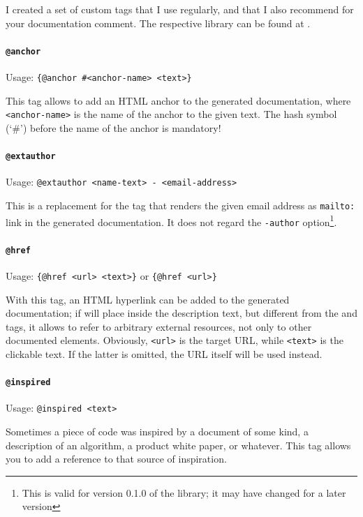 \documentclass[11pt,a4paper, titlepage, parskip=half, headsepline, footsepline, cleardoublepage=current, headheight=1cm]{scrbook}
\begin{document}
I created a set of custom tags that I use regularly, and that I also recommend for your documentation comment. The respective library can be found at \autocite{TQUADRAT_ORG_FOUNDATION_JAVADOC}.

\paragraph{\lstinline|@anchor|}\label{sec:TagAnchor}  Usage: \lstinline|{@anchor #<anchor-name> <text>}|

This tag allows to add an HTML anchor to the generated documentation, where \verb#<anchor-name># is the name of the anchor to the given text. The hash symbol (‘\#’) before the name of the anchor is mandatory!

\paragraph{\lstinline|@extauthor|}\label{sec:TagExtAuthor}  Usage: \lstinline|@extauthor <name-text> - <email-address>|

This is a replacement for the  tag that renders the given email address as \verb#mailto:# link in the generated documentation. It does not regard the \verb#-author# option\footnote{This is valid for version 0.1.0 of the library; it may have changed for a later version}. 

\paragraph{\lstinline|@href|}\label{sec:TagHref}  Usage: \lstinline|{@href <url> <text>}| or \lstinline|{@href <url>}|

With this tag, an HTML hyperlink can be added to the generated documentation; if will place inside the description text, but different from the  and  tags, it allows to refer to arbitrary external resources, not only to other documented elements. Obviously, \verb#<url># is the target URL, while \verb#<text># is the clickable text. If the latter is omitted, the URL itself will be used instead.

\paragraph{\lstinline|@inspired|}\label{sec:TagInspired}  Usage: \lstinline|@inspired <text>|

Sometimes a piece of code was inspired by a document of some kind, a description of an algorithm, a product white paper, or whatever. This tag allows you to add a reference to that source of inspiration. 
\end{document}
